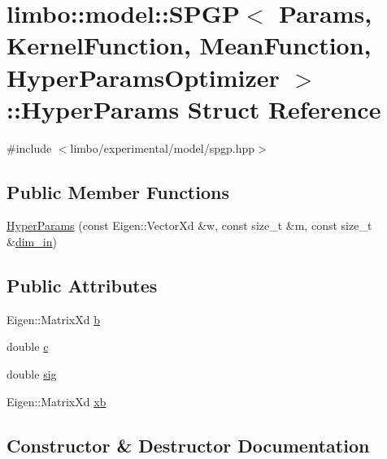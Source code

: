 \hypertarget{structlimbo_1_1model_1_1_s_p_g_p_1_1_hyper_params}{}\section{limbo\+:\+:model\+:\+:S\+P\+GP$<$ Params, Kernel\+Function, Mean\+Function, Hyper\+Params\+Optimizer $>$\+:\+:Hyper\+Params Struct Reference}
\label{structlimbo_1_1model_1_1_s_p_g_p_1_1_hyper_params}


{\ttfamily \#include $<$limbo/experimental/model/spgp.\+hpp$>$}

\subsection*{Public Member Functions}
\begin{DoxyCompactItemize}
\item 
\hyperlink{structlimbo_1_1model_1_1_s_p_g_p_1_1_hyper_params_a6451ddb2f4ffc94e9f7c0c9fce7ed520}{Hyper\+Params} (const Eigen\+::\+Vector\+Xd \&w, const size\+\_\+t \&m, const size\+\_\+t \&\hyperlink{classlimbo_1_1model_1_1_s_p_g_p_ab84d7663a814757766c2d630e0bacd9e}{dim\+\_\+in})
\end{DoxyCompactItemize}
\subsection*{Public Attributes}
\begin{DoxyCompactItemize}
\item 
Eigen\+::\+Matrix\+Xd \hyperlink{structlimbo_1_1model_1_1_s_p_g_p_1_1_hyper_params_aa0f5678cadcdfc619c75282c967106ce}{b}
\item 
double \hyperlink{structlimbo_1_1model_1_1_s_p_g_p_1_1_hyper_params_ac7851b66eb3556f595b949ca241fef09}{c}
\item 
double \hyperlink{structlimbo_1_1model_1_1_s_p_g_p_1_1_hyper_params_aaefda5ae138a733a9435e9922582684c}{sig}
\item 
Eigen\+::\+Matrix\+Xd \hyperlink{structlimbo_1_1model_1_1_s_p_g_p_1_1_hyper_params_a867369e27386e051b800653e759443b2}{xb}
\end{DoxyCompactItemize}


\subsection{Constructor \& Destructor Documentation}
